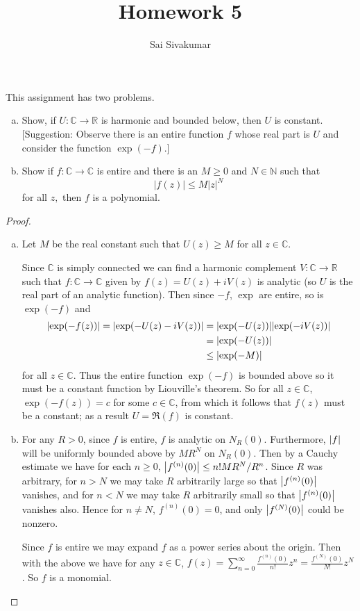 \documentclass[12pt]{amsart}
\title{Homework 5}
\author{Sai Sivakumar}
\newcommand{\RR}{\mathbb{R}}
\newcommand{\NN}{\mathbb{N}}
\newcommand{\CC}{\mathbb{C}}
\begin{document}
\maketitle

\thispagestyle{empty}

This assignment has two problems.
\begin{enumerate}[(a)] \itemsep=10pt
\item Show, if $U:\CC\to\RR$ is harmonic and
 bounded below, then $U$ is constant.
[Suggestion: Observe there is an entire
 function $f$ whose real part is $U$
 and consider the function $\exp(-f).$]
\item Show if $f:\CC\to\CC$ is entire
 and there is an $M\ge 0$ and $N\in \NN$ such that
\[
 |f(z)| \le M |z|^N
\]
 for all $z,$ then $f$ is a polynomial.
\end{enumerate}



\bigskip

\begin{proof}
\baselineskip=24pt
\begin{enumerate}[(a)]
    \item Let $M$ be the real constant such that $U(z)\geq M$ for all $z\in\mathbb{C}$. 
    
    Since $\mathbb{C}$ is simply connected we can find a harmonic complement $V\colon \mathbb{C}\to \mathbb{R}$ such that $f\colon\mathbb{C}\to\mathbb{C}$ given by $f(z) = U(z) + iV(z)$ is analytic (so $U$ is the real part of an analytic function). Then since $-f$, $\exp$ are entire, so is $\exp(-f)$ and \begin{align*}
        \abs{\exp(-f(z))} = \abs{\exp(-U(z)-iV(z))} &= \abs{\exp(-U(z))}\abs{\exp(-iV(z))}\\
        &= \abs{\exp(-U(z))}\\
        &\leq \abs{\exp(-M)}
    \end{align*} for all $z\in\mathbb{C}$. Thus the entire function $\exp(-f)$ is bounded above so it must be a constant function by Liouville's theorem. So for all $z\in\mathbb{C}$, $\exp(-f(z)) = c$ for some $c\in\mathbb{C}$, from which it follows that $f(z)$ must be a constant; as a result $U = \Re(f)$ is constant.

    \item For any $R>0$, since $f$ is entire, $f$ is analytic on $N_R(0)$. Furthermore, $\abs{f}$ will be uniformly bounded above by $MR^N$ on $N_R(0)$. Then by a Cauchy estimate we have for each $n\geq 0$, $\abs{f^{(n)}(0)}\leq n!MR^N/R^n$. Since $R$ was arbitrary, for $n> N$ we may take $R$ arbitrarily large so that $\abs{f^{(n)}(0)}$ vanishes, and for $n<N$ we may take $R$ arbitrarily small so that $\abs{f^{(n)}(0)}$ vanishes also. Hence  for $n\neq N$, $f^{(n)}(0) = 0$, and only $\abs{f^{(N)}(0)}$ could be nonzero. 
    
    Since $f$ is entire we may expand $f$ as a power series about the origin. Then with the above we have for any $z\in\mathbb{C}$, $f(z) = \sum_{n=0}^\infty \frac{f^{(n)}(0)}{n!}z^n = \frac{f^{(N)}(0)}{N!}z^N$. So $f$ is a monomial.
\end{enumerate}
\end{proof}
\end{document}
